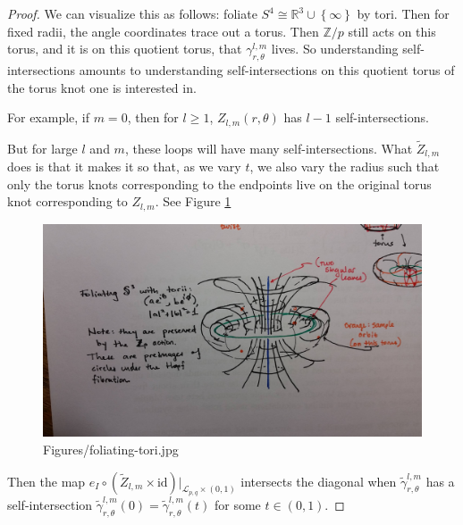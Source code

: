 \documentclass[reqno]{amsart}
\theoremstyle{definition}
\theoremstyle{remark}
\newcommand{\id}{{\mathrm{id}}}
\begin{document}
\begin{proof}
    We can visualize this as follows: 
    foliate $S^{4} \cong \mathbb{R}^3 \cup \left\{ \infty \right\} $ 
    by tori. Then for fixed radii, the
    angle coordinates trace out a torus.
    Then $\mathbb{Z}/p$ still acts on this torus, and 
    it is on this quotient torus, that
    $\gamma_{r, \theta}^{l,m}$ lives.
    So understanding self-intersections amounts to
    understanding self-intersections on this quotient torus of the
    torus knot one is interested in.

    For example, if
    $m = 0$, then for $l\ge 1$,
    $Z_{l,m}\left( r , \theta \right) $ has
    $l-1$ self-intersections.

    But for large $l$ and $m$, these loops will have many self-intersections.
    What $\tilde{Z}_{l,m}$ does is that
    it makes it so that, as we vary $t$, we also vary
    the radius such that only the torus knots
    corresponding to the endpoints
    live on the original torus knot corresponding to
    $Z_{l,m}$. See Figure \ref{fig:Figures-foliating-tori-jpg}


    \begin{figure}[htpb]
        \centering
        \includegraphics[width=1\textwidth]{Figures/foliating-tori.jpg}
        \caption{Figures/foliating-tori.jpg}
        \label{fig:Figures-foliating-tori-jpg}
    \end{figure}








    Then the map $e_I \circ \left( \tilde{Z}_{l,m}\times \id \right) 
    |_{\mathcal{L}_{p,q} \times  (0,1)}$ intersects
    the diagonal when $\tilde{\gamma}_{r,\theta}^{l,m}$ has a 
    self-intersection $\tilde{\gamma}_{r, \theta}^{l,m}(0)=
    \tilde{\gamma}_{r,\theta}^{l,m}(t)$ for
    some $t \in (0,1)$.



\end{proof}
\end{document}
